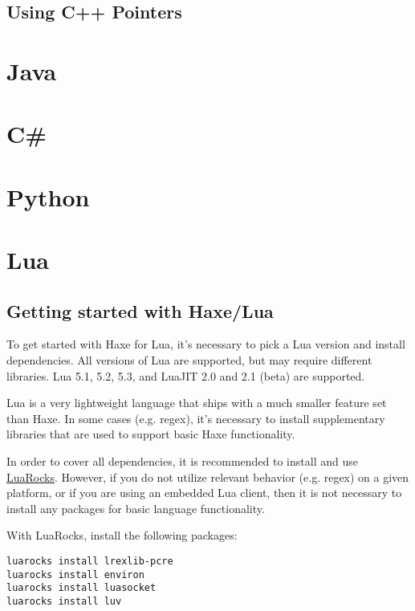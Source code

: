 \subsection{Using C++ Pointers}
\label{target-cpp-pointers}

\section{Java}
\label{target-java}

\section{C\#}
\label{target-cs}

\section{Python}
\label{target-python}

\section{Lua}
\label{target-lua}

\subsection{Getting started with Haxe/Lua}
\label{target-lua-getting-started}

To get started with Haxe for Lua, it's necessary to pick a Lua version and install
dependencies.  All versions of Lua are supported, but may require different
libraries.  Lua 5.1, 5.2, 5.3, and LuaJIT 2.0 and 2.1 (beta) are supported.

Lua is a very lightweight language that ships with a much smaller  feature set
than Haxe.  In some cases (e.g. regex), it's necessary to install supplementary
libraries that are used to support basic Haxe functionality.

In order to cover all dependencies, it is recommended to install and use
\href{https://github.com/luarocks/luarocks/wiki/Download}{LuaRocks}.  However,
if you do not utilize relevant behavior (e.g. regex) on a given platform,
or if you are using an embedded Lua client, then it is not necessary to
install any packages for basic language functionality.

With LuaRocks, install the following packages:

\begin{lstlisting}
luarocks install lrexlib-pcre
luarocks install environ
luarocks install luasocket
luarocks install luv
\end{lstlisting}

